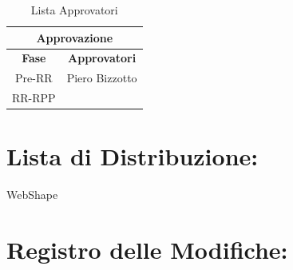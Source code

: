 \begin{table}[!h]
	\begin{center}
		\begin{tabular}
			{|c|c|}
			\hline
			\multicolumn{2}{|c|}{ \textbf{Approvazione} } \\
			\hline
			\textbf{Fase} & \textbf{Approvatori} \\
			\hline
			{Pre-RR} & Piero Bizzotto  \\
			\hline
			{RR-RPP} & \\
			\hline
		\end{tabular}
		\caption{Lista Approvatori} %
		\label{tabapprovazione}
	\end{center}
\end{table}
\textbf{}


\section*{\LARGE Lista di Distribuzione:}

	\begin{elenconumerato}{\normindent}
		\item WebShape 
	\end{elenconumerato}

\newpage

\section*{\LARGE Registro delle Modifiche:}


